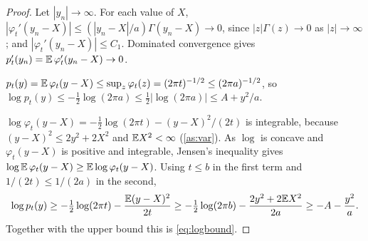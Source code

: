 \documentclass{saim-blog}
\begin{document}
\begin{proof}
Let $|y_n|\to\infty$. For each value of $X$, $|\varphi_t'(y_n-X)|\le(|y_n-X|/a)\Gamma(y_n-X)\to0$, since $|z|\Gamma(z)\to0$ as $|z|\to\infty$; and $|\varphi_t'(y_n-X)|\le C_1$. Dominated convergence gives $p_t'(y_n)=\mathbb{E}\,\varphi_t'(y_n-X)\to0$.

$p_t(y)=\mathbb{E}\,\varphi_t(y-X)\le\sup_z\varphi_t(z)=(2\pi t)^{-1/2}\le(2\pi a)^{-1/2}$, so $\log p_t(y)\le-\tfrac12\log(2\pi a)\le\tfrac12|\log(2\pi a)|\le A+y^2/a$.

$\log\varphi_t(y-X)=-\tfrac12\log(2\pi t)-(y-X)^2/(2t)$ is integrable, because $(y-X)^2\le2y^2+2X^2$ and $\mathbb{E} X^2<\infty$ (\cref{as:var}). As $\log$ is concave and $\varphi_t(y-X)$ is positive and integrable, Jensen's inequality gives $\log\mathbb{E}\,\varphi_t(y-X)\ge\mathbb{E}\log\varphi_t(y-X)$. Using $t\le b$ in the first term and $1/(2t)\le1/(2a)$ in the second,
\[
\log p_t(y)\ge-\tfrac12\log(2\pi t)-\frac{\mathbb{E}(y-X)^2}{2t}\ge-\tfrac12\log(2\pi b)-\frac{2y^2+2\mathbb{E} X^2}{2a}\ge-A-\frac{y^2}{a}.
\]
Together with the upper bound this is \eqref{eq:logbound}.
\end{proof}
\end{document}
